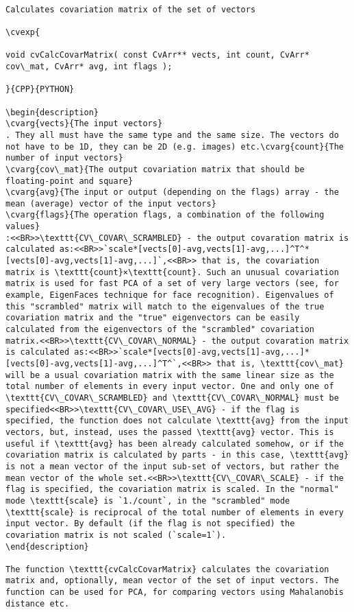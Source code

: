 \begin{verbatim}

Calculates covariation matrix of the set of vectors

\cvexp{

void cvCalcCovarMatrix( const CvArr** vects, int count, CvArr* cov\_mat, CvArr* avg, int flags );

}{CPP}{PYTHON}

\begin{description}
\cvarg{vects}{The input vectors}
. They all must have the same type and the same size. The vectors do not have to be 1D, they can be 2D (e.g. images) etc.\cvarg{count}{The number of input vectors}
\cvarg{cov\_mat}{The output covariation matrix that should be floating-point and square}
\cvarg{avg}{The input or output (depending on the flags) array - the mean (average) vector of the input vectors}
\cvarg{flags}{The operation flags, a combination of the following values}
:<<BR>>\texttt{CV\_COVAR\_SCRAMBLED} - the output covaration matrix is calculated as:<<BR>>`scale*[vects[0]-avg,vects[1]-avg,...]^T^*[vects[0]-avg,vects[1]-avg,...]`,<<BR>> that is, the covariation matrix is \texttt{count}×\texttt{count}. Such an unusual covariation matrix is used for fast PCA of a set of very large vectors (see, for example, EigenFaces technique for face recognition). Eigenvalues of this "scrambled" matrix will match to the eigenvalues of the true covariation matrix and the "true" eigenvectors can be easily calculated from the eigenvectors of the "scrambled" covariation matrix.<<BR>>\texttt{CV\_COVAR\_NORMAL} - the output covaration matrix is calculated as:<<BR>>`scale*[vects[0]-avg,vects[1]-avg,...]*[vects[0]-avg,vects[1]-avg,...]^T^`,<<BR>> that is, \texttt{cov\_mat} will be a usual covariation matrix with the same linear size as the total number of elements in every input vector. One and only one of \texttt{CV\_COVAR\_SCRAMBLED} and \texttt{CV\_COVAR\_NORMAL} must be specified<<BR>>\texttt{CV\_COVAR\_USE\_AVG} - if the flag is specified, the function does not calculate \texttt{avg} from the input vectors, but, instead, uses the passed \texttt{avg} vector. This is useful if \texttt{avg} has been already calculated somehow, or if the covariation matrix is calculated by parts - in this case, \texttt{avg} is not a mean vector of the input sub-set of vectors, but rather the mean vector of the whole set.<<BR>>\texttt{CV\_COVAR\_SCALE} - if the flag is specified, the covariation matrix is scaled. In the "normal" mode \texttt{scale} is `1./count`, in the "scrambled" mode \texttt{scale} is reciprocal of the total number of elements in every input vector. By default (if the flag is not specified) the covariation matrix is not scaled (`scale=1`).
\end{description}

The function \texttt{cvCalcCovarMatrix} calculates the covariation matrix and, optionally, mean vector of the set of input vectors. The function can be used for PCA, for comparing vectors using Mahalanobis distance etc.


\end{verbatim}
